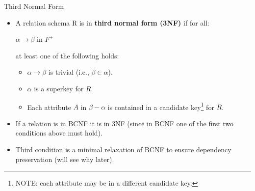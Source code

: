 \documentclass{beamer}
\begin{document}
\begin{frame}{Third Normal Form}
    \begin{itemize}
        \item A relation schema R is in \textbf{third normal form (3NF)} if for all:
            \begin{center}
                $\alpha \rightarrow \beta$ in $F^+$
            \end{center}
        at least one of the following holds:
            \begin{itemize}
                \item $\alpha \rightarrow \beta$ is trivial (i.e., $\beta \in \alpha$).
                \item $\alpha$ is a superkey for $R$.
                \item Each attribute $A$ in $\beta - \alpha$ is contained in a candidate key\footnote{NOTE: each attribute may be in a different candidate key.} for $R$.
            \end{itemize}
        \item If a relation is in BCNF it is in 3NF (since in BCNF one of the first two conditions above must hold).
        \item Third condition is a minimal relaxation of BCNF to ensure dependency preservation (will see why later).
    \end{itemize}
\end{frame}
\end{document}
